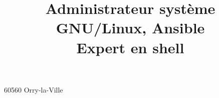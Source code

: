 \title{Administrateur système GNU/Linux, Ansible\\ Expert en shell}

\usepackage{fontawesome}
\providecommand*{\gitlabsocialsymbol}{}
\renewcommand*{\gitlabsocialsymbol}{{\scriptsize\faGitlab}~}

\address{4 Impasse de la ferme}{60560 Orry-la-Ville}%

